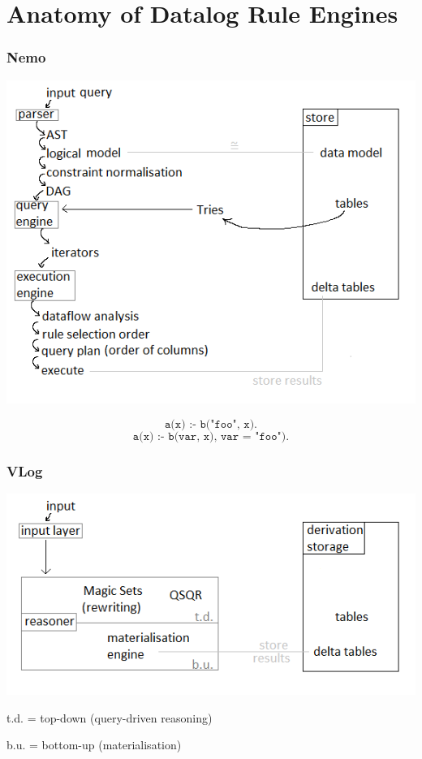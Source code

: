 \documentclass[aspectratio=169]{beamer}
\begin{document}
\section{Anatomy of Datalog Rule Engines}

\begin{frame}
	\frametitle{Nemo}
	 {
		\begin{center}
		\includegraphics[scale=.5]{figures/nemo.png}
		\end{center}
	}
	 {
		\[ \texttt{a(x) :- b("foo", x).} \]
		\[ \texttt{a(x) :- b(var, x), var = "foo").} \]
	}
\end{frame}

\begin{frame}
	\frametitle{VLog}
	\begin{center}
	\includegraphics[scale=.6]{figures/vlog.png}
	\end{center}
	\vspace{1em}
		t.d. = top-down (query-driven reasoning)
		
		b.u. = bottom-up (materialisation)
\end{frame}
\end{document}
